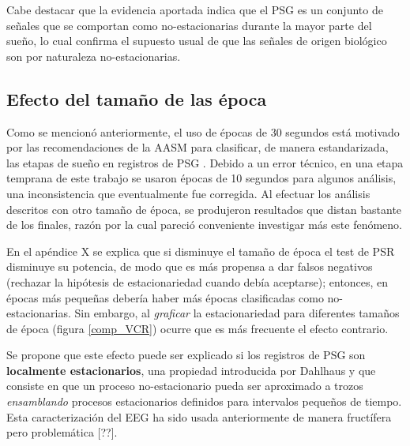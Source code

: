 Cabe destacar que la evidencia aportada indica que el PSG es un conjunto de señales que se comportan
como no-estacionarias durante la mayor parte del sueño, lo cual confirma el supuesto usual de que 
las señales de origen biológico son por naturaleza no-estacionarias. 

\subsection{Efecto del tamaño de las época}

Como se mencionó anteriormente, el uso de épocas de 30 segundos está motivado por las 
recomendaciones de la AASM para clasificar, de manera estandarizada, las etapas de sueño en
registros de PSG \cite{AASM07}. 
Debido a un error técnico, en una etapa temprana de este trabajo se usaron épocas de 10 segundos 
para algunos análisis, una inconsistencia que eventualmente fue corregida.
Al efectuar los análisis descritos con otro tamaño de época, se produjeron resultados que distan
bastante de los finales, razón por la cual pareció conveniente investigar más este fenómeno.

En el apéndice X se explica que si disminuye el tamaño de época el test de PSR disminuye su 
potencia, de modo que es más propensa a dar falsos negativos (rechazar la hipótesis de 
estacionariedad cuando debía aceptarse); entonces, en épocas más pequeñas debería haber más épocas 
clasificadas como no-estacionarias.
Sin embargo, al \textit{graficar} la estacionariedad para diferentes tamaños de época (figura
\ref{comp_VCR}) ocurre que es más frecuente el efecto contrario.


Se propone que este efecto puede ser explicado si los registros de PSG son \textbf{localmente
estacionarios}, una propiedad introducida por Dahlhaus \cite{Dahlhaus97} y que consiste en que un
proceso no-estacionario pueda ser aproximado a trozos \textit{ensamblando} procesos estacionarios
definidos para intervalos pequeños de tiempo.
Esta caracterización del EEG ha sido usada anteriormente de manera fructífera pero problemática
[??].

